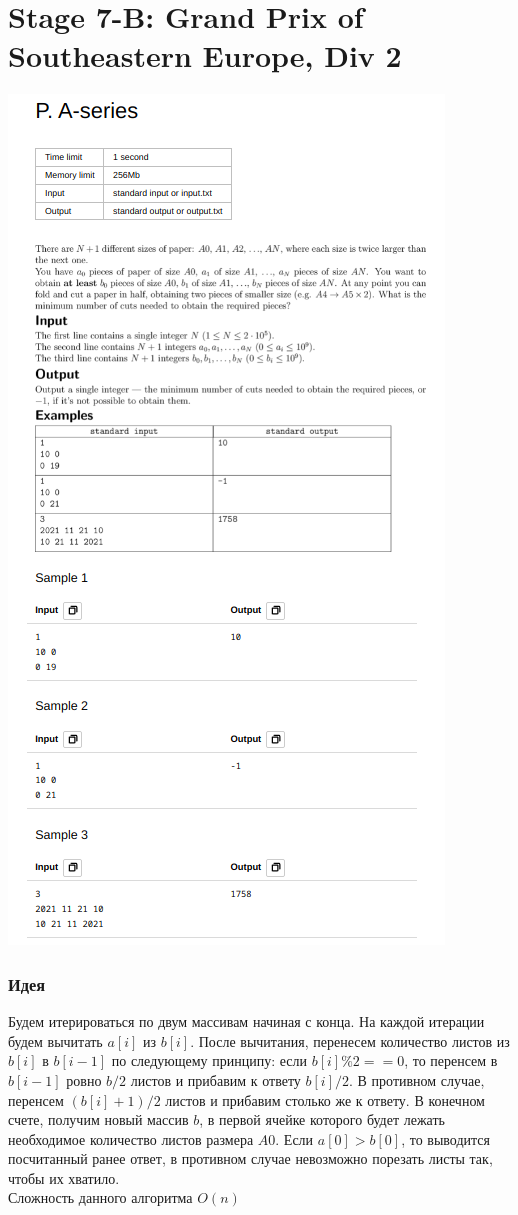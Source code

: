 \documentclass[12pt]{article}
\begin{document}
\section{Stage 7-B: Grand Prix of Southeastern Europe, Div 2}
\includegraphics[scale=0.75]{statements/7_P.png}
\subsubsection*{Идея}
Будем итерироваться по двум массивам начиная с конца. На каждой итерации будем вычитать $a[i]$ из $b[i]$. После вычитания, перенесем количество 
листов из $b[i]$ в $b[i-1]$ по следующему принципу: если $b[i] \% 2 == 0$, то перенсем в $b[i-1]$ ровно $b/2$ листов и прибавим к ответу $b[i]/2$. 
В противном случае, перенсем $(b[i] + 1)/2$ листов и прибавим столько же к ответу. В конечном счете, получим новый массив $b$, в  первой ячейке 
которого будет лежать необходимое количество листов размера $A0$. Если $a[0] > b[0]$, то выводится посчитанный ранее ответ, в противном случае 
невозможно порезать листы так, чтобы их хватило.
\\ 
Сложность данного алгоритма $O(n)$
\end{document}
